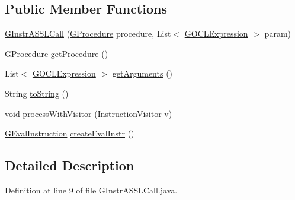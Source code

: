 \subsection*{Public Member Functions}
\begin{DoxyCompactItemize}
\item 
\hyperlink{classorg_1_1tzi_1_1use_1_1gen_1_1assl_1_1statics_1_1_g_instr_a_s_s_l_call_a4e4a24ae0e0e7e090c8b97f34d8fa922}{G\-Instr\-A\-S\-S\-L\-Call} (\hyperlink{classorg_1_1tzi_1_1use_1_1gen_1_1assl_1_1statics_1_1_g_procedure}{G\-Procedure} procedure, List$<$ \hyperlink{classorg_1_1tzi_1_1use_1_1gen_1_1assl_1_1statics_1_1_g_o_c_l_expression}{G\-O\-C\-L\-Expression} $>$ param)
\item 
\hyperlink{classorg_1_1tzi_1_1use_1_1gen_1_1assl_1_1statics_1_1_g_procedure}{G\-Procedure} \hyperlink{classorg_1_1tzi_1_1use_1_1gen_1_1assl_1_1statics_1_1_g_instr_a_s_s_l_call_a2257ebbb903d1ac36d832c09b3dacd27}{get\-Procedure} ()
\item 
List$<$ \hyperlink{classorg_1_1tzi_1_1use_1_1gen_1_1assl_1_1statics_1_1_g_o_c_l_expression}{G\-O\-C\-L\-Expression} $>$ \hyperlink{classorg_1_1tzi_1_1use_1_1gen_1_1assl_1_1statics_1_1_g_instr_a_s_s_l_call_a9cbd48f5686687af59715820cba16a34}{get\-Arguments} ()
\item 
String \hyperlink{classorg_1_1tzi_1_1use_1_1gen_1_1assl_1_1statics_1_1_g_instr_a_s_s_l_call_ac2228a87ddb849ed8d7edcf6476dac43}{to\-String} ()
\item 
void \hyperlink{classorg_1_1tzi_1_1use_1_1gen_1_1assl_1_1statics_1_1_g_instr_a_s_s_l_call_aefacc8ed738d7f4a1ddd1bf770640006}{process\-With\-Visitor} (\hyperlink{interfaceorg_1_1tzi_1_1use_1_1gen_1_1assl_1_1statics_1_1_instruction_visitor}{Instruction\-Visitor} v)
\item 
\hyperlink{classorg_1_1tzi_1_1use_1_1gen_1_1assl_1_1dynamics_1_1_g_eval_instruction}{G\-Eval\-Instruction} \hyperlink{classorg_1_1tzi_1_1use_1_1gen_1_1assl_1_1statics_1_1_g_instr_a_s_s_l_call_a632ec8c28b4bbd738111893c3939881e}{create\-Eval\-Instr} ()
\end{DoxyCompactItemize}


\subsection{Detailed Description}


Definition at line 9 of file G\-Instr\-A\-S\-S\-L\-Call.\-java.



